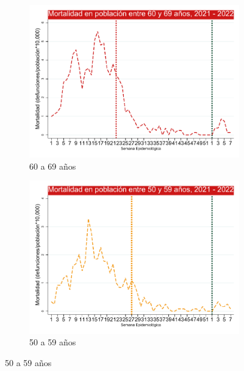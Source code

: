 \documentclass[12pt,a4paper,openany]{book}
\begin{document}
\begin{figure}[h]
	\vspace{10mm}
	\begin{subfigure}[b]{0.45\textwidth}
		\centering
		\includegraphics[width=\textwidth]{../figuras/mortalidad_edad_60.pdf}
		\caption{60 a 69 años}
	\end{subfigure}
	\hfill
	\begin{subfigure}[b]{0.45\textwidth}
		\centering
		\includegraphics[width=\textwidth]{../figuras/mortalidad_edad_50.pdf}
		\caption{50 a 59 años}
	\end{subfigure}
	

\end{figure}
\end{document}
